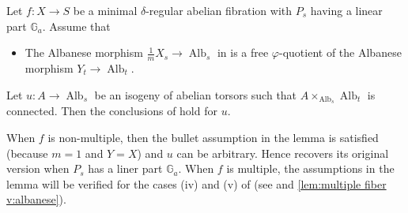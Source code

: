 \documentclass[reqno, letterpaper]{amsart}
\numberwithin{equation}{subsection}
\let\to\longrightarrow
\newcommand{\GG}{\mathbb{G}}
\DeclareMathOperator{\Alb}{Alb}
\begin{document}
			\begin{lemma}  \label{lem:untangle for multiple}
				Let $f : X \to S$ be a minimal $\delta$-regular abelian fibration with $P_s$ having a linear part $\GG_a$. Assume that
				\begin{itemize}
					\item The Albanese morphism $\frac{1}{m}X_s \to \Alb_s$ in  is a free $\varphi$-quotient of the Albanese morphism $Y_t \to \Alb_t$.
				\end{itemize}
				Let $u : A \to \Alb_s$ be an isogeny of abelian torsors such that $A \times_{\Alb_s} \Alb_t$ is connected. Then the conclusions of  hold for $u$.
			\end{lemma}
			
			When $f$ is non-multiple, then the bullet assumption in the lemma is satisfied (because $m = 1$ and $Y = X$) and $u$ can be arbitrary. Hence  recovers its original version when $P_s$ has a liner part $\GG_a$. When $f$ is multiple, the assumptions in the lemma will be verified for the cases (iv) and (v) of  (see  and \ref{lem:multiple fiber v:albanese}).
			
\end{document}
